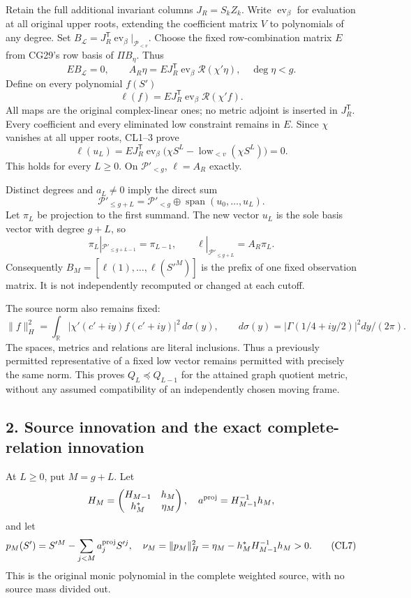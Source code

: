 \documentclass[11pt]{article}
\begin{document}
Retain the full additional invariant columns \(J_R=S_kZ_k\). Write \(\operatorname{ev}_\beta\) for evaluation at all original upper roots, extending the coefficient matrix \(V\) to polynomials of any degree. Set \(B_{\mathcal L}=J_R^{\mathsf T}\operatorname{ev}_\beta|_{\mathcal P_{<v}}\). Choose the fixed row-combination matrix \(E\) from CG29's row basis of \(\Pi B_\eta\). Thus \[
EB_{\mathcal L}=0,\qquad
A_R\eta=EJ_R^{\mathsf T}\operatorname{ev}_\beta\mathcal R(\chi'\eta),
\quad \deg\eta<g.
\] Define on every polynomial \(f(S')\) \[
\ell(f)=EJ_R^{\mathsf T}\operatorname{ev}_\beta\mathcal R(\chi'f).
\tag{CL3}
\] All maps are the original complex-linear ones; no metric adjoint is inserted in \(J_R^{\mathsf T}\). Every coefficient and every eliminated low constraint remains in \(E\). Since \(\chi\) vanishes at all upper roots, CL1--3 prove \[
\ell(u_L)
=EJ_R^{\mathsf T}\operatorname{ev}_\beta
\bigl(\chi S^L-\operatorname{low}_{<v}(\chi S^L)\bigr)=0.
\tag{CL4}
\] This holds for every \(L\ge0\). On \(\mathcal P'_{<g}\), \(\ell=A_R\) exactly.

Distinct degrees and \(a_L\ne0\) imply the direct sum \[
\mathcal P'_{\le g+L}
=\mathcal P'_{<g}\oplus\operatorname{span}(u_0,\ldots,u_L).
\] Let \(\pi_L\) be projection to the first summand. The new vector \(u_L\) is the sole basis vector with degree \(g+L\), so \[
\pi_L|_{\mathcal P'_{\le g+L-1}}=\pi_{L-1},\qquad
\ell|_{\mathcal P'_{\le g+L}}=A_R\pi_L.
\tag{CL5}
\] Consequently \(B_M=[\ell(1),\ldots,\ell(S'^M)]\) is the prefix of one fixed observation matrix. It is not independently recomputed or changed at each cutoff.

The source norm also remains fixed: \[
\|f\|_H^2=\int_{\mathbb R}
|\chi'(c'+iy)f(c'+iy)|^2\,d\sigma(y),\qquad
d\sigma(y)=|\Gamma(1/4+iy/2)|^2dy/(2\pi).
\tag{CL6}
\] The spaces, metrics and relations are literal inclusions. Thus a previously permitted representative of a fixed low vector remains permitted with precisely the same norm. This proves \(Q_L\preceq Q_{L-1}\) for the attained graph quotient metric, without any assumed compatibility of an independently chosen moving frame.

\subsection{2. Source innovation and the exact complete-relation innovation}\label{source-innovation-and-the-exact-complete-relation-innovation}

At \(L\ge0\), put \(M=g+L\). Let \[
H_M=\begin{pmatrix}H_{M-1}&h_M\\h_M^*&\eta_M\end{pmatrix},\quad
a^{\rm proj}=H_{M-1}^{-1}h_M,
\] and let \[
p_M(S')=S'^M-\sum_{j<M}a^{\rm proj}_jS'^j,\quad
\nu_M=\|p_M\|_H^2=\eta_M-h_M^*H_{M-1}^{-1}h_M>0.
\tag{CL7}
\] This is the original monic polynomial in the complete weighted source, with no source mass divided out.
\end{document}
